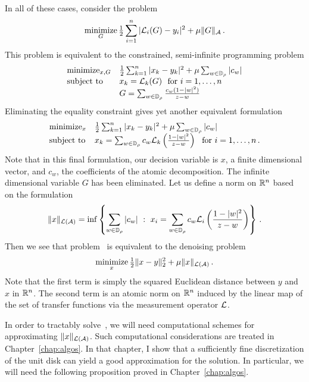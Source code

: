 In all of these cases, consider the problem
\begin{equation}\label{eq:atomic-norm-lin-inverse}
	\mathop{\operatorname{minimize}}_{G} \tfrac{1}{2} \sum_{i=1}^n |\mathcal{L}_i(G) - y_i |^2 + \mu \|G\|_{\mathcal{A}}\,.
\end{equation}
This problem is equivalent to the constrained, semi-infinite programming problem
\[
	\begin{array}{ll}
	\mathop{\operatorname{minimize}}_{x,G} & \tfrac{1}{2}\sum_{k=1}^n |x_k - y_k |^2 + \mu \sum_{w\in \mathbb{D}_\rho} |c_w|\\
	\mbox{subject to} & x_k = \mathcal{L}_k(G)~~\mbox{for}~i=1,\ldots, n\\
	& G = \sum_{w\in \mathbb{D}_\rho} \frac{c_w(1-|w|^2)}{z-w}
	\end{array}
\]
Eliminating the equality constraint gives yet another equivalent formulation
\begin{equation}\label{eq:atomic-norm-lin-inverse-finite-dim}
	\begin{array}{ll}
	\mathop{\operatorname{minimize}}_{x} & \tfrac{1}{2}\sum_{k=1}^n |x_k - y_k |^2 + \mu \sum_{w\in \mathbb{D}_\rho} |c_w|\\
	\mbox{subject to} & x_k = \sum_{w\in \mathbb{D}_\rho} c_w \mathcal{L}_k\left(\frac{1-|w|^2}{z-w}\right)~~\mbox{for}~i=1,\ldots, n\,.
	\end{array}
\end{equation}
Note that in this final formulation, our decision variable is $x$, a finite dimensional vector, and $c_w$, the coefficients of the atomic decomposition.  The infinite dimensional variable $G$ has been eliminated.  Let us define a norm on $\mathbb{R}^n$ based on the formulation~
\[
	\|x\|_{\mathcal{L}(\mathcal{A})} = \inf \left\{ \sum_{w\in \mathbb{D}_\rho} |c_w| ~:~ x_i = \sum_{w\in\mathbb{D}_\rho} c_w\mathcal{L}_i\left(\frac{1-|w|^2}{z-w} \right)\right\}\,.
\]
Then we see that problem~ is equivalent to the denoising problem
\begin{equation}\label{eq:finite-dim-ast}
	\mathop{\operatorname{minimize}}_{x} \tfrac{1}{2}\|x-y\|_2^2 + \mu \|x\|_{\mathcal{L}(\mathcal{A})}\,.
\end{equation}
Note that the first term is simply the squared Euclidean distance between $y$
and $x$ in $\mathbb{R}^n$. The second term is an atomic norm on $\mathbb{R}^n$ induced by the
linear map of the set of transfer functions via the measurement operator $\mathcal{L}$.

In order to tractably solve~, we will need
computational schemes for approximating $\|x\|_{\mathcal{L}(\mathcal{A})}$. Such computational
considerations are treated in Chapter~\ref{chap:algos}. In that chapter, I show
that a sufficiently fine discretization of the unit disk can yield a good
approximation for the solution. In particular, we will need the following
proposition proved in Chapter~\ref{chap:algos}.

